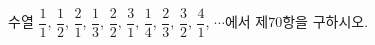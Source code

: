 \hspace*{2mm}\begin{minipage}[t]{\dimexpr\linewidth-2mm\relax}\vspace{0pt}
수열 $\dfrac{1}{1}$, $\dfrac{1}{2}$, $\dfrac{2}{1}$, $\dfrac{1}{3}$, $\dfrac{2}{2}$, $\dfrac{3}{1}$, $\dfrac{1}{4}$, $\dfrac{2}{3}$, $\dfrac{3}{2}$, $\dfrac{4}{1}$, $\cdots$에서 제$70$항을 구하시오.\end{minipage}
